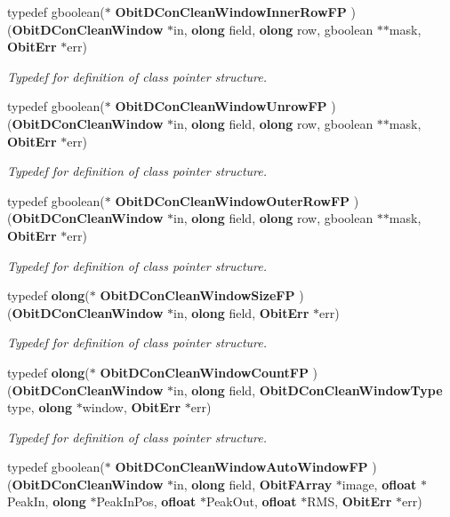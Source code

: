 \begin{CompactItemize}
typedef gboolean($\ast$ {\bf Obit\-DCon\-Clean\-Window\-Inner\-Row\-FP} )({\bf Obit\-DCon\-Clean\-Window} $\ast$in, {\bf olong} field, {\bf olong} row, gboolean $\ast$$\ast$mask, {\bf Obit\-Err} $\ast$err)
\begin{CompactList}\small\item\em Typedef for definition of class pointer structure. \item\end{CompactList}\item 
typedef gboolean($\ast$ {\bf Obit\-DCon\-Clean\-Window\-Unrow\-FP} )({\bf Obit\-DCon\-Clean\-Window} $\ast$in, {\bf olong} field, {\bf olong} row, gboolean $\ast$$\ast$mask, {\bf Obit\-Err} $\ast$err)
\begin{CompactList}\small\item\em Typedef for definition of class pointer structure. \item\end{CompactList}\item 
typedef gboolean($\ast$ {\bf Obit\-DCon\-Clean\-Window\-Outer\-Row\-FP} )({\bf Obit\-DCon\-Clean\-Window} $\ast$in, {\bf olong} field, {\bf olong} row, gboolean $\ast$$\ast$mask, {\bf Obit\-Err} $\ast$err)
\begin{CompactList}\small\item\em Typedef for definition of class pointer structure. \item\end{CompactList}\item 
typedef {\bf olong}($\ast$ {\bf Obit\-DCon\-Clean\-Window\-Size\-FP} )({\bf Obit\-DCon\-Clean\-Window} $\ast$in, {\bf olong} field, {\bf Obit\-Err} $\ast$err)
\begin{CompactList}\small\item\em Typedef for definition of class pointer structure. \item\end{CompactList}\item 
typedef {\bf olong}($\ast$ {\bf Obit\-DCon\-Clean\-Window\-Count\-FP} )({\bf Obit\-DCon\-Clean\-Window} $\ast$in, {\bf olong} field, {\bf Obit\-DCon\-Clean\-Window\-Type} type, {\bf olong} $\ast$window, {\bf Obit\-Err} $\ast$err)
\begin{CompactList}\small\item\em Typedef for definition of class pointer structure. \item\end{CompactList}\item 
typedef gboolean($\ast$ {\bf Obit\-DCon\-Clean\-Window\-Auto\-Window\-FP} )({\bf Obit\-DCon\-Clean\-Window} $\ast$in, {\bf olong} field, {\bf Obit\-FArray} $\ast$image, {\bf ofloat} $\ast$Peak\-In, {\bf olong} $\ast$Peak\-In\-Pos, {\bf ofloat} $\ast$Peak\-Out, {\bf ofloat} $\ast$RMS, {\bf Obit\-Err} $\ast$err)
$$
\end{CompactItemize}
